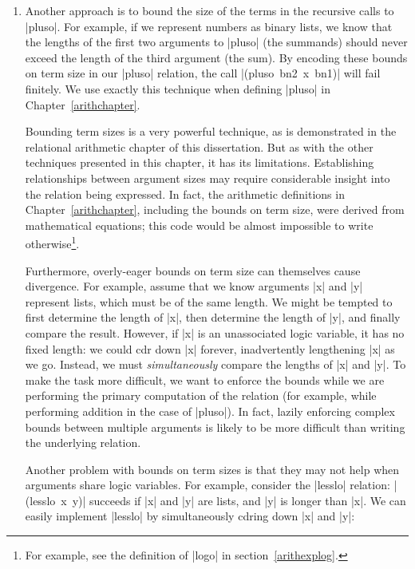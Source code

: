 \begin{enumerate}
\item Another approach is to bound the size of the terms in the
recursive calls to \scheme|pluso|.  For example, if we represent numbers
as binary lists, we know that the lengths of the first two arguments
to \scheme|pluso| (the summands) should never exceed the length of the
third argument (the sum).  By encoding these bounds on term size in
our \scheme|pluso| relation, the call \mbox{\scheme|(pluso bn2 x bn1)|}
will fail finitely.  We use exactly this technique when defining
\scheme|pluso| in Chapter~\ref{arithchapter}.

Bounding term sizes is a very powerful technique, as is demonstrated
in the relational arithmetic chapter of this dissertation.  But as
with the other techniques presented in this chapter, it has its
limitations.  Establishing relationships between argument sizes may
require considerable insight into the relation being expressed.  In
fact, the arithmetic definitions in Chapter~\ref{arithchapter},
including the bounds on term size, were derived from mathematical
equations; this code would be almost impossible to write otherwise\footnote{For example, see the definition of \scheme|logo| in section~\ref{arithexplog}.}.

Furthermore, overly-eager bounds on term size can themselves cause
divergence.  For example, assume that we know arguments \scheme|x| and
\scheme|y| represent lists, which must be of the same length.  We
might be tempted to first determine the length of \scheme|x|, then
determine the length of \scheme|y|, and finally compare the result.
However, if \scheme|x| is an unassociated logic variable, it has no
fixed length: we could cdr down \scheme|x| forever, inadvertently
lengthening \scheme|x| as we go.  Instead, we must
\emph{simultaneously} compare the lengths of \scheme|x| and
\scheme|y|.  To make the task more difficult, we want to enforce the
bounds while we are performing the primary computation of the relation
(for example, while performing addition in the case of \scheme|pluso|).
In fact, lazily enforcing complex bounds between multiple arguments is
likely to be more difficult than writing the underlying relation.

Another problem with bounds on term sizes is that they may not help
when arguments share logic variables.  For example, consider the
\scheme|lesslo| relation: \mbox{\scheme|(lesslo x y)|} succeeds if
\scheme|x| and \scheme|y| are lists, and \scheme|y| is longer than
\scheme|x|.  We can easily implement \scheme|lesslo| by simultaneously
cdring down \scheme|x| and \scheme|y|:


\end{enumerate}
